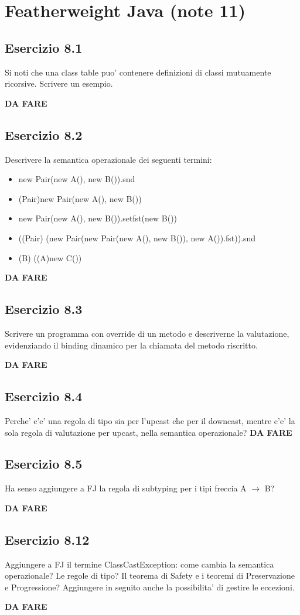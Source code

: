 \section{Featherweight Java (note 11)}
\subsection*{Esercizio 8.1} 
Si noti che una class table puo' contenere definizioni di classi mutuamente ricorsive. Scrivere un esempio.

\textbf{{\color{red} DA FARE}}

\subsection*{Esercizio 8.2} 
Descrivere la semantica operazionale dei seguenti termini:
\begin{itemize}
	\item new Pair(new A(), new B()).snd
	\item (Pair)new Pair(new A(), new B())
	\item new Pair(new A(), new B()).setfst(new B())
	\item ((Pair) (new Pair(new Pair(new A(), new B()), new A()).fst)).snd
	\item  (B) ((A)new C())
\end{itemize} 

\textbf{{\color{red} DA FARE}}

\subsection*{Esercizio 8.3} 
Scrivere un programma con override di un metodo e descriverne la valutazione, evidenziando il binding dinamico per la chiamata del metodo riscritto.

\textbf{{\color{red} DA FARE}}

\subsection*{Esercizio 8.4} 
Perche' c'e' una regola di tipo sia per l'upcast che per il downcast, mentre c'e' la sola regola di valutazione per upcast, nella semantica operazionale?
\textbf{{\color{red} DA FARE}}

\subsection*{Esercizio 8.5} 
Ha senso aggiungere a FJ la regola di subtyping per i tipi freccia A $\rightarrow$ B?

\textbf{{\color{red} DA FARE}}

\subsection*{Esercizio 8.12} 
Aggiungere a FJ il termine ClassCastException: come cambia la semantica operazionale? Le regole di tipo? Il teorema di Safety e i teoremi di Preservazione e Progressione? Aggiungere in seguito anche la possibilita' di gestire le eccezioni.

\textbf{{\color{red} DA FARE}}